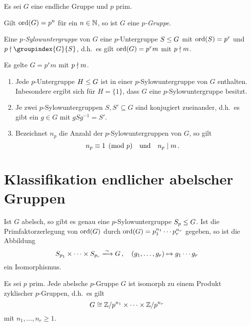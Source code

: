Es sei $G$ eine endliche Gruppe und $p$ prim.

\begin{definition}
  Gilt $\operatorname{ord}(G) = p^n$ für ein $n \in \mathbb{N}$, so ist $G$ eine \emph{$p$-Gruppe}.
\end{definition}

\begin{definition}
  Eine \emph{$p$-Sylow\-unter\-gruppe} von $G$ eine $p$-Untergruppe $S \mathrel{\leq} G$ mit $\operatorname{ord}(S) = p^r$ und $p \notdivides \groupindex{G}{S}$, d.h.\ es gilt $\operatorname{ord}(G) = p^r m$ mit $p \mathrel{\nmid} m$.
\end{definition}

\begin{theorem}[Sylowsätze]
  Es gelte $G = p^r m$ mit $p \mathrel{\nmid} m$.
  \begin{enumerate}
    \item
      Jede $p$-Untergruppe $H \mathrel{\leq} G$ ist in einer $p$-Sylowuntergruppe von $G$ enthalten.
      Inbesondere ergibt sich für $H = \{1\}$, dass $G$ eine $p$-Sylowuntergruppe besitzt.
    \item
      Je zwei $p$-Sylowuntergruppen $S, S' \subseteq G$ sind konjugiert zueinander, d.h.\ es gibt ein $g \in G$ mit $g S g^{-1} = S'$.
    \item
      Bezeichnet $n_p$ die Anzahl der $p$-Sylowuntergruppen von $G$, so gilt
      \[
                n_p
        \equiv  1
        \pmod{p}
        \quad\text{und}\quad
        n_p \mathrel{|} m \,.
      \]

  \end{enumerate}
\end{theorem}



\section{Klassifikation endlicher abelscher Gruppen}

\begin{theorem}
  Ist $G$ abelsch, so gibt es genau eine $p$-Sylowuntergruppe $S_p \mathrel{\leq} G$.
  Ist die Primfaktorzerlegung von $\operatorname{ord}(G)$ durch $\operatorname{ord}(G) = p_1^{n_1} \dotsm p_r^{n_r}$ gegeben, so ist die Abbildung
  \[
                            S_{p_1} \times \dotsb \times S_{p_r}
    \xlongrightarrow{\sim}  G \,,
    \quad                   (g_1, \dotsc, g_r)
    \mapsto                 g_1 \dotsm g_r
  \]
  ein Isomorphismus.
\end{theorem}

\begin{proposition}
  Es sei $p$ prim.
  Jede abelsche $p$-Gruppe $G$ ist isomorph zu einem Produkt zyklischer $p$-Gruppen, d.h.\ es gilt
  \[
          G
    \cong \mathbb{Z}/p^{n_1} \times \dotsm \times \mathbb{Z}/p^{n_r}
  \]
  mit $n_1, \dotsc, n_r \geq 1$.
\end{proposition}


